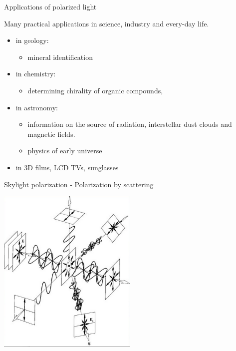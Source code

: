 \begin{frame}{Applications of polarized light}

Many practical applications in science, industry and every-day life.

\begin{itemize}
  \item in geology:
     \begin{itemize}
           \item mineral identification
     \end{itemize}
  \item in chemistry:
     \begin{itemize}
           \item determining chirality of organic compounds,
     \end{itemize}
  \item in astronomy:
     \begin{itemize}
            \item information on the source of radiation, interstellar dust clouds and magnetic fields.
            \item physics of early universe
     \end{itemize}
  \item in 3D films, LCD TVs, sunglasses

\end{itemize}

\end{frame}


%
%
%

\begin{frame}{Skylight polarization - Polarization by scattering}

\begin{center}
   \includegraphics[width=0.50\textwidth]{./images/schematics/skylight_polarization_scattering.png}\\
\end{center}

\end{frame}


